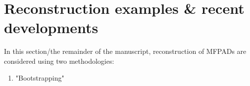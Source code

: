 \section{Reconstruction examples & recent developments}

In this section/the remainder of the manuscript, reconstruction of MFPADs are considered using two methodologies:

\begin{enumerate}
\item "Bootstrapping"
\end{enumerate}